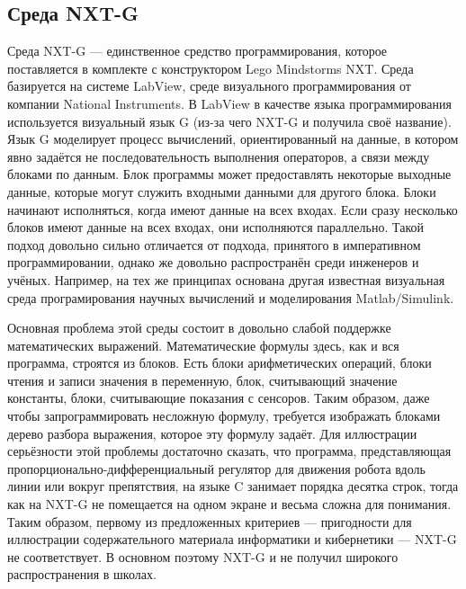 \documentclass[a4paper]{article}
\begin{document}
\subsection{Среда NXT-G}
Среда NXT-G --- единственное средство программирования, которое поставляется в комплекте с конструктором Lego Mindstorms NXT. Среда базируется на системе LabView, среде визуального программирования от компании National Instruments. В LabView в качестве языка программирования используется визуальный язык G (из-за чего NXT-G и получила своё название). Язык G моделирует процесс вычислений, ориентированный на данные, в котором явно задаётся не последовательность выполнения операторов, а связи между блоками по данным. Блок программы может предоставлять некоторые выходные данные, которые могут служить входными данными для другого блока. Блоки начинают исполняться, когда имеют данные на всех входах. Если сразу несколько блоков имеют данные на всех входах, они исполняются параллельно. Такой подход довольно сильно отличается от подхода, принятого в императивном программировании, однако же довольно распространён среди инженеров и учёных. Например, на тех же принципах основана другая известная визуальная среда програмирования научных вычислений и моделирования Matlab/Simulink.

Основная проблема этой среды состоит в довольно слабой поддержке математических выражений. Математические формулы здесь, как и вся программа, строятся из блоков. Есть блоки арифметических операций, блоки чтения и записи значения в переменную, блок, считывающий значение константы, блоки, считывающие показания с сенсоров. Таким образом, даже чтобы запрограммировать несложную формулу, требуется изображать блоками дерево разбора выражения, которое эту формулу задаёт. Для иллюстрации серьёзности этой проблемы достаточно сказать, что программа, представляющая пропорционально-дифференциальный регулятор для движения робота вдоль линии или вокруг препятствия, на языке C занимает порядка десятка строк, тогда как на NXT-G не помещается на одном экране и весьма сложна для понимания. Таким образом, первому из предложенных критериев --- пригодности для иллюстрации содержательного материала информатики и кибернетики --- NXT-G не соответствует. В основном поэтому NXT-G и не получил широкого распространения в школах.
\end{document}
